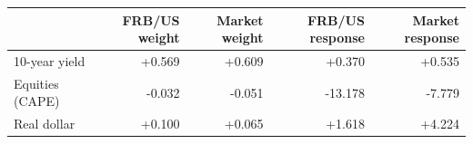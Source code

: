 \begin{tabular}{lrrrr}
\toprule
 & FRB/US weight & Market weight & FRB/US response & Market response \\
\midrule
10-year yield & +0.569 & +0.609 & +0.370 & +0.535 \\
Equities (CAPE) & -0.032 & -0.051 & -13.178 & -7.779 \\
Real dollar & +0.100 & +0.065 & +1.618 & +4.224 \\
\bottomrule
\end{tabular}
